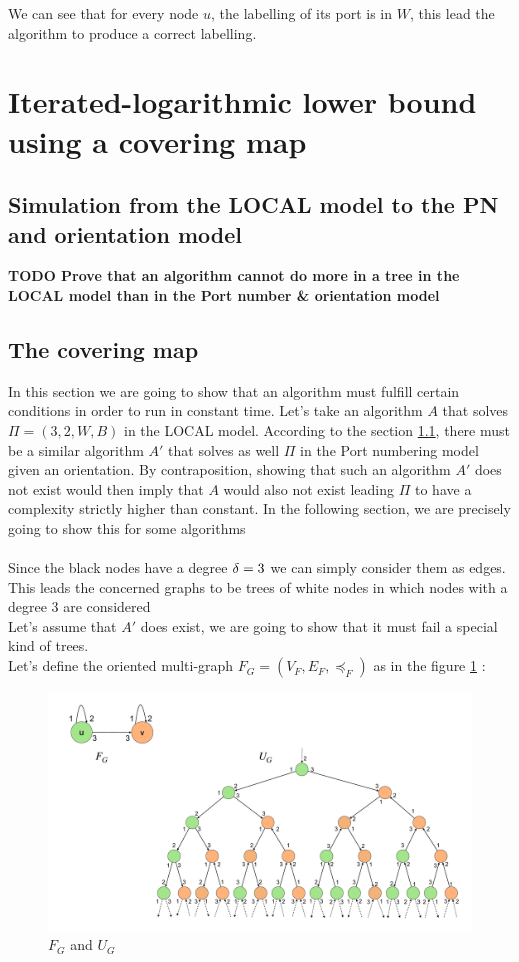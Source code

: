 We can see that for every node $u$, the labelling of its port is in $W$, this lead the algorithm to produce a correct labelling.

\section{Iterated-logarithmic lower bound using a covering map}
\subsection{Simulation from the LOCAL model to the PN and orientation model}\label{sec:simulation}
\textbf{TODO Prove that an algorithm cannot do more in a tree in the LOCAL model than in the Port number \& orientation model}\\
\subsection{The covering map}
In this section we are going to show that an algorithm must fulfill certain conditions in order to run in constant time.
Let's take an algorithm $A$ that solves $\Pi = (3,2,W,B)$ in the LOCAL model. According to the section \ref{sec:simulation}, there must be a similar algorithm $A'$ that solves as well $\Pi$ in the Port numbering model given an orientation. By contraposition, showing that such an algorithm $A'$ does not exist would then imply that $A$ would also not exist leading $\Pi$ to have a complexity strictly higher than constant.
In the following section, we are precisely going to show this for some algorithms\\\\

Since the black nodes have a degree $\delta = 3$ we can simply consider them as edges. This leads the concerned graphs to be trees of white nodes in which nodes with a degree 3 are considered\\
Let's assume that $A'$ does exist, we are going to show that it must fail a special kind of trees.\\
Let's define the oriented multi-graph $F_G = (V_F, E_F,\preceq_F)$ as in the figure \ref{fig:cv1} :\\
\begin{figure}[htb]
    \centering
    \includegraphics[scale = 0.22]{Figures/cover.pdf}
    \caption{$F_G$ and $U_G$}
    \label{fig:cv1}
\end{figure}


